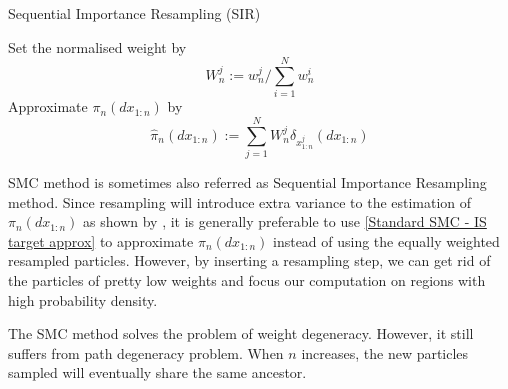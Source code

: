 \documentclass[12pt,a4paper]{article}
\begin{document}
\begin{algorithm}[ht]
    \caption{Sequential Importance Resampling (SIR)}
    Set the normalised weight by 
    $$W_n^j := w_n^j / \sum_{i=1}^N w_{n}^i$$
    Approximate $\pi_n\left(dx_{1:n}\right)$ by 
    $$\hat{\pi}_n(dx_{1:n}) := \sum_{j=1}^{N} W_n^j \delta_{x_{1:n}^j}(dx_{1:n})$$
    \label{Alg:SIR}
\end{algorithm}

SMC method is sometimes also referred as Sequential Importance Resampling method. Since resampling will introduce extra variance to the estimation of $\pi_{n}(dx_{1:n})$ as shown by \cite{chopin2004central}, it is generally preferable to use \eqref{Standard SMC - IS target approx} to approximate $\pi_n(dx_{1:n})$ instead of using the equally weighted resampled particles. However, by inserting a resampling step, we can get rid of the particles of pretty low weights and focus our computation on regions with high probability density. 

The SMC method solves the problem of weight degeneracy. However, it still suffers from path degeneracy problem. When $n$ increases, the new particles sampled will eventually share the same ancestor.
\end{document}

